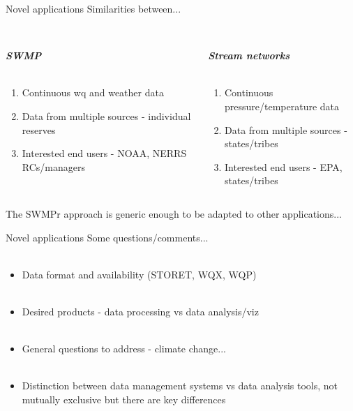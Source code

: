 \documentclass[serif]{beamer}\usepackage[]{graphicx}\usepackage[]{color}
\newcommand{\Bigtxt}[1]{\textbf{\textit{#1}}}
\begin{document}
\begin{frame}{Novel applications}
Similarities between... \\~\\
\begin{columns}[t]
\begin{column}{0.45\textwidth}
\Bigtxt{SWMP}\\~\\
\begin{enumerate}
\item Continuous wq and weather data
\item Data from multiple sources - individual reserves
\item Interested end users - NOAA, NERRS RCs/managers
\end{enumerate}
\end{column}
\begin{column}{0.45\textwidth}
\Bigtxt{Stream networks} \\~\\
\begin{enumerate}
\item Continuous pressure/temperature data
\item Data from multiple sources - states/tribes
\item Interested end users - EPA, states/tribes
\end{enumerate}
\end{column}
\end{columns}
\vspace{0.3in}
The SWMPr approach is generic enough to be adapted to other applications...
\end{frame}

\begin{frame}{Novel applications}
Some questions/comments... \\~\\
\begin{itemize}
\item Data format and availability (STORET, WQX, WQP) \\~\\
\item Desired products - data processing vs data analysis/viz \\~\\
\item General questions to address - climate change... \\~\\
\item Distinction between data management systems vs data analysis tools, not mutually exclusive but there are key differences
\end{itemize}

\end{frame}
\end{document}
